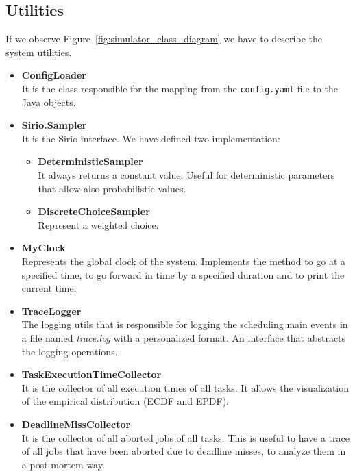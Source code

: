 \subsection{Utilities}
If we observe Figure~\ref{fig:simulator_class_diagram} we have to describe the system utilities.
\begin{itemize}
    \item \textbf{ConfigLoader} \\
        It is the class responsible for the mapping from the \texttt{config.yaml} file to the Java objects.
    \item \textbf{Sirio.Sampler} \\
        It is the Sirio interface. We have defined two implementation:
        \begin{itemize}
            \item \textbf{DeterministicSampler} \\
                It always returns a constant value. Useful for deterministic parameters that allow also probabilistic values.
            \item \textbf{DiscreteChoiceSampler} \\
                Represent a weighted choice.
        \end{itemize}
    \item \textbf{MyClock} \\
        Represents the global clock of the system. Implements the method to go at a specified time, to go forward in time by a specified duration and to print the current time.
    \item \textbf{TraceLogger} \\
        The logging utils that is responsible for logging the scheduling main events in a file named \textit{trace.log} with a personalized format. An interface that abstracts the logging operations.
    \item \textbf{TaskExecutionTimeCollector} \\
        It is the collector of all execution times of all tasks. It allows the visualization of the empirical distribution (ECDF and EPDF).
    \item \textbf{DeadlineMissCollector} \\
        It is the collector of all aborted jobs of all tasks. This is useful to have a trace of all jobs that have been aborted due to deadline misses, to analyze them in a post-mortem way.
\end{itemize}

